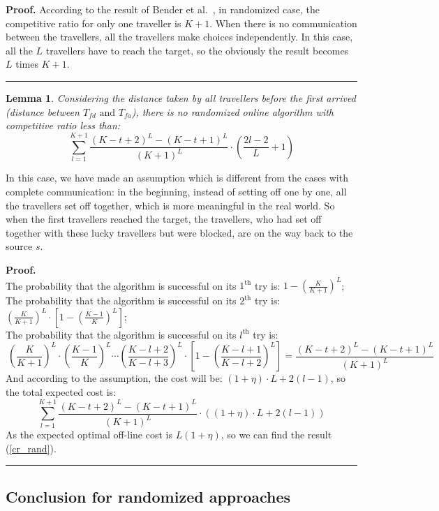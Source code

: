 \documentclass[letter-size, 11pt]{article}
\newtheorem{lemma}{Lemma}
\newenvironment{proof}[1][Proof]{\textbf{#1.} }{\ \rule{0.5em}{0.5em}}
\begin{document}
\begin{proof} 
According to the result of Bender et al.~\cite{BeWe15}, in randomized case, the competitive ratio for only one traveller is $K+1$. When there is no communication between the travellers, all the travellers make choices independently. In this case, all the $L$ travellers have to reach the target, so the obviously the result becomes $L$ times $K+1$.
\end{proof}

\begin{lemma}
Considering the distance taken by all travellers before the first arrived (distance between $T_{fd} \mbox{\ and } T_{fa}$), there is no randomized online algorithm with competitive ratio less than:
\begin{equation}
\sum_{l=1}^{K+1}\frac{(K-t+2)^{L} - (K-t+1)^{L}}{(K+1)^{L}}\cdot (\frac{2l-2}{L}+1)
\label{cr_rand}
\end{equation}
\end{lemma}

In this case, we have made an assumption which is different from the cases with complete communication: in the beginning, instead of setting off one by one, all the travellers set off together, which is more meaningful in the real world. So when the first travellers reached the target, the travellers, who had set off together with these lucky travellers but were blocked, are on the way back to the source $s$.

\begin{proof} 
\\The probability that the algorithm is successful on its $1^{\text{th}}$ try is: $1-(\frac{K}{K+1})^{L}$;
\\The probability that the algorithm is successful on its $2^{\text{th}}$ try is: $(\frac{K}{K+1})^{L} \cdot [1-(\frac{K-1}{K})^{L}]$;
\\The probability that the algorithm is successful on its $l^{\text{th}}$ try is: 
\[
\ (\frac{K}{K+1})^{L} \cdot  (\frac{K-1}{K})^{L}\cdots  (\frac{K-l+2}{K-l+3})^{L}\cdot [1-(\frac{K-l+1}{K-l+2})^{L}] = \frac{(K-t+2)^{L} - (K-t+1)^{L}}{(K+1)^{L}}
\]
And according to the assumption, the cost will be: $(1+\eta)\cdot L + 2(l-1) $, so the total expected cost is:
\[
\sum_{l=1}^{K+1}\frac{(K-t+2)^{L} - (K-t+1)^{L}}{(K+1)^{L}}\cdot ((1+\eta)\cdot L + 2(l-1) )
\]
As the expected optimal off-line cost is $L(1 + \eta)$, so we can find the result (\ref{cr_rand}).
\end{proof}

\subsection{Conclusion for randomized approaches} 
\end{document}
